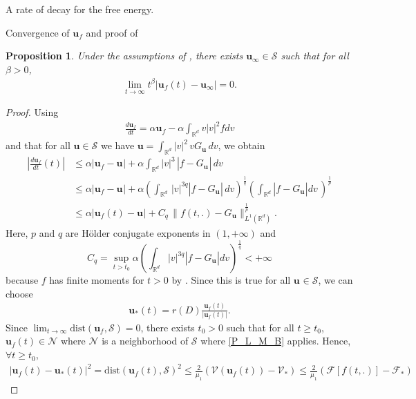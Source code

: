 \documentclass[reqno]{amsart} %
\newtheorem{proposition}{Proposition}[section]
\begin{document}
\begin{section}{A rate of decay for the free energy.}
\begin{section}{Convergence of \texorpdfstring{$\mathbf{u}_{f}$}{uf} and proof of~\texorpdfstring{}{thm2}}
    \begin{proposition}
    \label{convdeJf}
       Under the assumptions of ,  there exists $\mathbf{u}_{\infty} \in \mathcal{S}$ such that for all $\beta >0$, 
        \begin{align*}
            \lim_{t\rightarrow \infty}t^{\beta}|\mathbf{u}_{f}(t)- \mathbf{u}_{\infty}| =0.
        \end{align*}
    \end{proposition}
\begin{proof}
    Using
    \begin{align}
    \label{derivéuf}
        \frac{d \mathbf{u}_{f}}{dt}=\alpha \mathbf{u}_{f}- \alpha \int_{\mathbb{R}^d}v|v|^2fdv 
    \end{align}
    and that for all $\mathbf{u} \in \mathcal{S}$ we have $\mathbf{u}= \int_{\mathbb{R}^d}|v|^2\,v G_{\mathbf{u}}\,dv$, we obtain
    \begin{align*}
     \left|  \frac{d\mathbf{u}_{f} }{dt}(t)\right|& \leq  \alpha \left| \mathbf{u}_{f} -\mathbf{u}_{} \right| + \alpha \int_{\mathbb{R}^d}  |v|^3 \, | f-G_{\mathbf{u}_{}}|\, dv \\
     &\leq  \alpha \left| \mathbf{u}_{f} -\mathbf{u}_{} \right| + \alpha \left( \int_{\mathbb{R}^d} \, |v|^{3q} | f-G_{\mathbf{u}_{}}| \,dv \right)^{\frac{1}{q}} \left( \int_{\mathbb{R}^d} | f-G_{\mathbf{u}_{}}| dv \,  \right)^{\frac{1}{p}} \\
     & \leq  \alpha \left| \mathbf{u}_{f}(t) -\mathbf{u}_{} \right| + C_q \,\lVert f(t,.)-G_{\mathbf{u}_{}}\rVert_{L^1(\mathbb{R}^d)}^{\frac{1}{p}}.
\end{align*}
Here, $p$ and $q$ are Hölder conjugate exponents in $(1,+\infty)$ and $$C_q = \sup_{ t >t_0}{ \alpha \left( \int_{\mathbb{R}^d}  |v|^{3q} | f-G_{\mathbf{u}_{}}| dv \right)^{\frac{1}{q}}} < +\infty$$
because $f$ has finite moments for $t>0$ by .
Since this is true for all $\mathbf{u}_{} \in \mathcal{S}$, we can choose 
\begin{align}
\label{ustar}
    \mathbf{u}_{*}(t)= r(D) \frac{\mathbf{u}_{f}(t)}{|\mathbf{u}_{f}(t)|}. 
\end{align}
Since $\lim_{t\rightarrow \infty}\mathrm{dist}(\mathbf{u}_{f},\mathcal{S})=0$, there exists $t_0>0$ such that for all $t\geq t_0$, $\mathbf{u}_{f}(t)\in \mathcal{N}$ where $\mathcal{N}$ is a neighborhood of $\mathcal{S}$ where  \eqref{P_L_M_B} applies. Hence, $\forall t \geq t_0$,
\begin{align*}
     |\mathbf{u}_{f}(t)-\mathbf{u}_{*}(t)|^2 =\mathrm{dist}(\mathbf{u}_{f}(t),\mathcal{S})^2\leq \frac{2}{\mu_1}(\mathcal{V}(\mathbf{u}_{f}(t))-\mathcal{V}_*) \leq \frac{2}{\mu_1}(\mathcal{F}[f(t,.)]- \mathcal{F}_*) 

\end{align*}
\end{proof}
\end{section}
\end{section}
\end{document}
